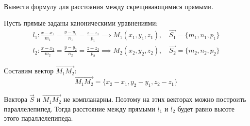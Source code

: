 \begin{question}
  Вывести формулу для расстояния между скрещивающимися прямыми.
\end{question}
\begin{answer}
  Пусть прямые заданы каноническими уравнениями:
\begin{gather*}
  l_1: \frac{x - x_1}{m_1} = \frac{y - y_1}{n_1} = \frac{z - z_1}{p_1} \implies M_1(x_1, y_1, z_1), \quad \vec{S_1} = \{m_1, n_1, p_1\} \\
  l_2: \frac{x - x_2}{m_2} = \frac{y - y_2}{n_2} = \frac{z - z_2}{p_2} \implies M_2(x_2, y_2, z_2), \quad \vec{S_2} = \{m_2, n_2, p_2\}
\end{gather*}

Составим вектор $\overrightarrow{M_1M_2}$: \[
\overrightarrow{M_1M_2} = \{x_2 - x_1, y_2 - y_1, z_2 - z_1\} 
\] 

Вектора $\vec{S}$ и $\overrightarrow{M_1M_2}$ не компланарны. 
Поэтому на этих векторах можно построить параллелепипед.
Тогда расстояние между прямыми $l_1$ и $l_2$ будет равно высоте этого параллелепипеда.


\end{answer}
